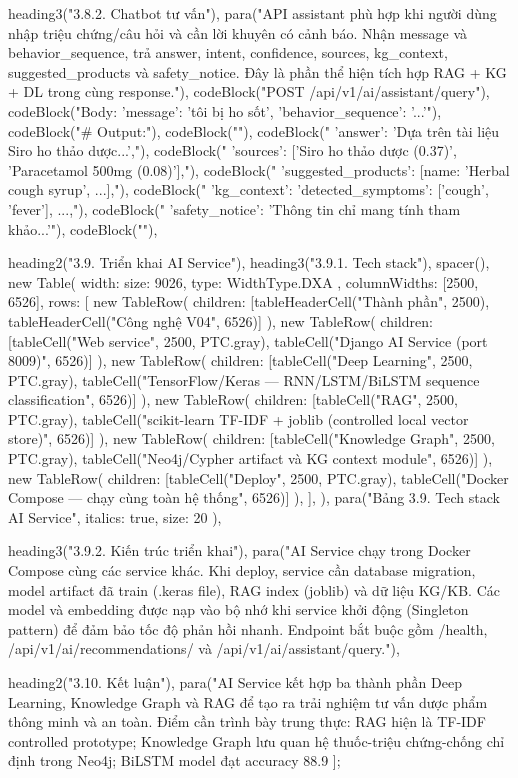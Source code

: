 {{{  heading3("3.8.2. Chatbot tư vấn"),
  para("API assistant phù hợp khi người dùng nhập triệu chứng/câu hỏi và cần lời khuyên có cảnh báo. Nhận message và behavior_sequence, trả answer, intent, confidence, sources, kg_context, suggested_products và safety_notice. Đây là phần thể hiện tích hợp RAG + KG + DL trong cùng response."),
  codeBlock("POST /api/v1/ai/assistant/query"),
  codeBlock("Body: {'message': 'tôi bị ho sốt', 'behavior_sequence': '...'}"),
  codeBlock("# Output:"),
  codeBlock("{"),
  codeBlock("  'answer': 'Dựa trên tài liệu Siro ho thảo dược...',"),
  codeBlock("  'sources': ['Siro ho thảo dược (0.37)', 'Paracetamol 500mg (0.08)'],"),
  codeBlock("  'suggested_products': [{name: 'Herbal cough syrup', ...}],"),
  codeBlock("  'kg_context': {'detected_symptoms': ['cough', 'fever'], ...},"),
  codeBlock("  'safety_notice': 'Thông tin chỉ mang tính tham khảo...'"),
  codeBlock("}"),

  heading2("3.9. Triển khai AI Service"),
  heading3("3.9.1. Tech stack"),
  spacer(),
  new Table({
    width: { size: 9026, type: WidthType.DXA },
    columnWidths: [2500, 6526],
    rows: [
      new TableRow({ children: [tableHeaderCell("Thành phần", 2500), tableHeaderCell("Công nghệ V04", 6526)] }),
      new TableRow({ children: [tableCell("Web service", 2500, PTC.gray), tableCell("Django AI Service (port 8009)", 6526)] }),
      new TableRow({ children: [tableCell("Deep Learning", 2500, PTC.gray), tableCell("TensorFlow/Keras — RNN/LSTM/BiLSTM sequence classification", 6526)] }),
      new TableRow({ children: [tableCell("RAG", 2500, PTC.gray), tableCell("scikit-learn TF-IDF + joblib (controlled local vector store)", 6526)] }),
      new TableRow({ children: [tableCell("Knowledge Graph", 2500, PTC.gray), tableCell("Neo4j/Cypher artifact và KG context module", 6526)] }),
      new TableRow({ children: [tableCell("Deploy", 2500, PTC.gray), tableCell("Docker Compose — chạy cùng toàn hệ thống", 6526)] }),
    ],
  }),
  para("Bảng 3.9. Tech stack AI Service", { italics: true, size: 20 }),

  heading3("3.9.2. Kiến trúc triển khai"),
  para("AI Service chạy trong Docker Compose cùng các service khác. Khi deploy, service cần database migration, model artifact đã train (.keras file), RAG index (joblib) và dữ liệu KG/KB. Các model và embedding được nạp vào bộ nhớ khi service khởi động (Singleton pattern) để đảm bảo tốc độ phản hồi nhanh. Endpoint bắt buộc gồm /health, /api/v1/ai/recommendations/ và /api/v1/ai/assistant/query."),

  heading2("3.10. Kết luận"),
  para("AI Service kết hợp ba thành phần Deep Learning, Knowledge Graph và RAG để tạo ra trải nghiệm tư vấn dược phẩm thông minh và an toàn. Điểm cần trình bày trung thực: RAG hiện là TF-IDF controlled prototype; Knowledge Graph lưu quan hệ thuốc-triệu chứng-chống chỉ định trong Neo4j; BiLSTM model đạt accuracy 88.9%
];

}}}
